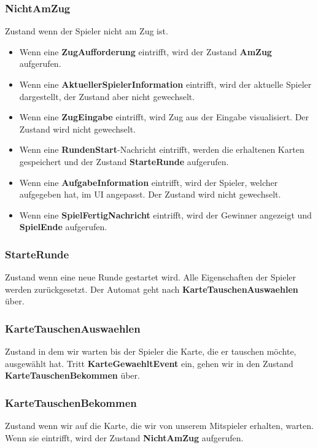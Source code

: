 \documentclass[12pt,halfparskip]{scrartcl}
\begin{document}
\subsubsection{NichtAmZug}
\label{ssub:nichtamzug}
Zustand wenn der Spieler nicht am Zug ist.
\begin{itemize}
	\item 	Wenn eine \textbf{ZugAufforderung} eintrifft, wird der Zustand \textbf{AmZug} aufgerufen.
	\item 	Wenn eine \textbf{AktuellerSpielerInformation} eintrifft, wird der aktuelle Spieler dargestellt, der Zustand aber nicht gewechselt.
	\item 	Wenn eine \textbf{ZugEingabe} eintrifft, wird Zug aus der Eingabe visualisiert. Der Zustand wird nicht gewechselt.
	\item 	Wenn eine \textbf{RundenStart}-Nachricht eintrifft, werden die erhaltenen Karten gespeichert und der Zustand \textbf{StarteRunde} aufgerufen.
	\item 	Wenn eine \textbf{AufgabeInformation} eintrifft, wird der Spieler, welcher aufgegeben hat, im UI angepasst. Der Zustand wird nicht gewechselt.
	\item 	Wenn eine \textbf{SpielFertigNachricht} eintrifft, wird der Gewinner angezeigt und \textbf{SpielEnde} aufgerufen.
\end{itemize}

\subsubsection{StarteRunde}
\label{ssub:starterunde}
Zustand wenn eine neue Runde gestartet wird. Alle Eigenschaften der Spieler werden zurückgesetzt. Der Automat geht nach \textbf{KarteTauschenAuswaehlen} über.

\subsubsection{KarteTauschenAuswaehlen}
\label{ssub:kartetauschenauswaehlen}
Zustand in dem wir warten bis der Spieler die Karte, die er tauschen möchte, ausgewählt hat. Tritt \textbf{KarteGewaehltEvent} ein, gehen wir in den Zustand \textbf{KarteTauschenBekommen} über.

\subsubsection{KarteTauschenBekommen}
\label{ssub:kartetauschenbekommen}
Zustand wenn wir auf die Karte, die wir von unserem Mitspieler erhalten, warten. Wenn sie eintrifft, wird der Zustand \textbf{NichtAmZug} aufgerufen.
\end{document}
